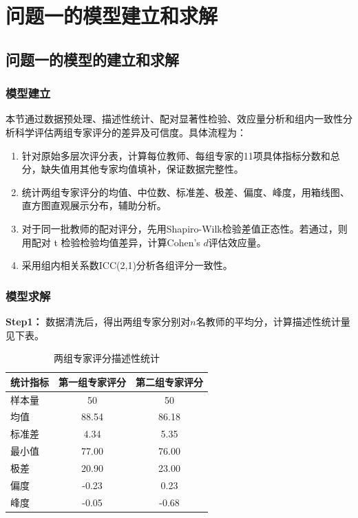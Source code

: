 \documentclass[withoutpreface,bwprint]{cumcmthesis}
\begin{document}

\section{问题一的模型建立和求解}

\subsection{问题一的模型的建立和求解}
\subsubsection{模型建立}
本节通过数据预处理、描述性统计、配对显著性检验、效应量分析和组内一致性分析科学评估两组专家评分的差异及可信度。具体流程为：
\begin{enumerate}
    \item 针对原始多层次评分表，计算每位教师、每组专家的11项具体指标分数和总分，缺失值用其他专家均值填补，保证数据完整性。
    \item 统计两组专家评分的均值、中位数、标准差、极差、偏度、峰度，用箱线图、直方图直观展示分布，辅助分析。
    \item 对于同一批教师的配对评分，先用Shapiro-Wilk检验差值正态性。若通过，则用配对 t 检验检验均值差异，计算Cohen's $d$评估效应量。
    \item 采用组内相关系数ICC(2,1)分析各组评分一致性。
\end{enumerate}

\subsubsection{模型求解}
\textbf{Step1：} 数据清洗后，得出两组专家分别对$n$名教师的平均分，计算描述性统计量见下表。

\begin{table}[H]
\centering
\caption{两组专家评分描述性统计}
\label{tab:descstat}
\begin{tabular}{lcc}
\toprule
统计指标 & 第一组专家评分 & 第二组专家评分 \\
\midrule
样本量      & 50        & 50        \\
均值        & 88.54     & 86.18     \\
标准差      & 4.34      & 5.35      \\
最小值      & 77.00     & 76.00     \\
极差        & 20.90     & 23.00     \\
偏度        & -0.23     & 0.23      \\
峰度        & -0.05     & -0.68     \\
\bottomrule
\end{tabular}
\end{table}
\end{document}
